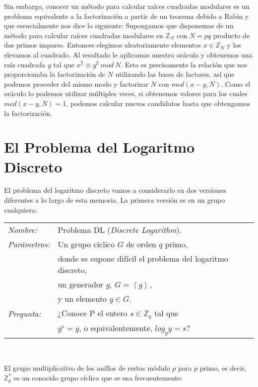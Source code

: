 Sin embargo, conocer un m\'etodo para calcular ra\'ices cuadradas modulares es un problema
equivalente a la factorizaci\'on a partir de un teorema debido a Rabin y que esencialmente nos
dice lo siguiente: Supongamos que disponemos de un m\'etodo para calcular ra\'ices cuadradas
modulares en ${\mathbb Z}_N$ con $N = pq$ producto de dos primos impares. Entonces elegimos
aleatoriamente elementos $x \in {\mathbb Z}_N$ y los elevamos al cuadrado. Al
resultado le aplicamos nuestro or\'aculo y obtenemos una ra\'iz cuadrada $y$ tal que $x^2
\equiv y^2 ~mod~N$. Esta es precisamente la relaci\'on que nos proporcionaba
la factorizaci\'on de $N$ utilizando las bases de factores, as\'i que podemos proceder del
mismo modo y factorizar $N$ con $mcd(x-y,N)$. Como el or\'aculo lo podemos
utilizar m\'ultiples veces, si obtenemos valores para los cuales $mcd(x-y,N) = 1$, podemos
calcular nuevos candidatos hasta que obtengamos la factorizaci\'on.


\section{El Problema del Logaritmo Discreto}

El problema del logaritmo discreto vamos a considerarlo en dos versiones diferentes a lo largo de esta memoria. La primera versi\'on es en un grupo cualquiera:

\hfil

\begin{tabular}{|ll}\label{problemaDL}
	\textit{Nombre:} & Problema DL (\textit{Discrete Logarithm}). \\
	\textit{Parámetros:} & Un grupo cíclico $G$ de orden $q$ primo, \\ & donde se supone difícil el problema del logaritmo discreto,  \\ & un generador $g$, $G=\left\langle g \right\rangle$,\\ & y un elemento $y\in G$. \\
	\textit{Pregunta:} & ¿Conoce P el entero $s\in \mathbb{Z}_q$ tal que \\ & $g^s = y$, o equivalentemente, $log_g y = s$? \\
\end{tabular}
\\

\hfil

El grupo multiplicativo de los anillos de restos m\'odulo $p$ para $p$ primo, es decir, ${\mathbb Z}^*_p$ es un conocido grupo c\'iclico que se usa frecuentemente:

